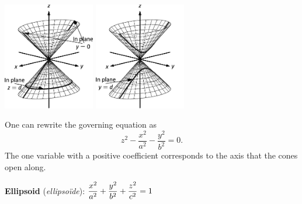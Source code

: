 \begin{center}
\includegraphics[width=0.3\textwidth]{fig_ana_geo_18b}\hspace*{1cm}
\includegraphics[width=0.3\textwidth]{fig_ana_geo_18c}
\end{center}

One can rewrite the governing equation as 
$$z^2-\dfrac{x^2}{a^2}-\dfrac{y^2}{b^2} = 0.$$
The one variable with a positive coefficient corresponds to the axis that the cones open along. 

\textbf{Ellipsoid} (\textit{ellipso\"ide}): \quad$\displaystyle \frac{x^2}{a^2}+\frac{y^2}{b^2}+\frac{z^2}{c^2}=1$

